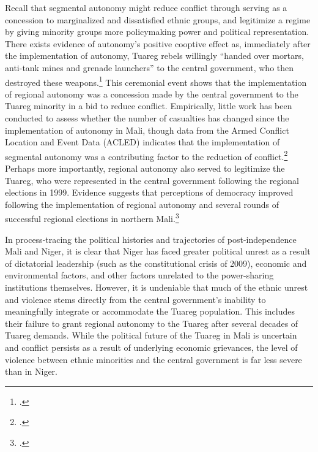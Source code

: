 \documentclass[12pt]{article}
\begin{document}
Recall that segmental autonomy might reduce conflict through serving as a concession to marginalized and dissatisfied ethnic groups, and legitimize a regime by giving minority groups more policymaking power and political representation. There exists evidence of autonomy's positive cooptive effect as, immediately after the implementation of autonomy, Tuareg rebels willingly ``handed over mortars, anti-tank mines and grenade launchers'' to the central government, who then destroyed these weapons.\footcite{unknown_tuareg_2008} This ceremonial event shows that the implementation of regional autonomy was a concession made by the central government to the Tuareg minority in a bid to reduce conflict. Empirically, little work has been conducted to assess whether the number of casualties has changed since the implementation of autonomy in Mali, though data from the Armed Conflict Location and Event Data (ACLED) indicates that the implementation of segmental autonomy was a contributing factor to the reduction of conflict.\footcite[,unpublished manuscript]{raleigh_introducing_2010, brailey_after_2019} Perhaps more importantly, regional autonomy also served to legitimize the Tuareg, who were represented in the central government following the regional elections in 1999. Evidence suggests that perceptions of democracy improved following the implementation of regional autonomy and several rounds of successful regional elections in northern Mali.\footcite{world_values_survey_world_nodate}

In process-tracing the political histories and trajectories of post-independence Mali and Niger, it is clear that Niger has faced greater political unrest as a result of dictatorial leadership (such as the constitutional crisis of 2009), economic and environmental factors, and other factors unrelated to the power-sharing institutions themselves. However, it is undeniable that much of the ethnic unrest and violence stems directly from the central government's inability to meaningfully integrate or accommodate the Tuareg population. This includes their failure to grant regional autonomy to the Tuareg after several decades of Tuareg demands. While the political future of the Tuareg in Mali is uncertain and conflict persists as a result of underlying economic grievances, the level of violence between ethnic minorities and the central government is far less severe than in Niger.
\end{document}
